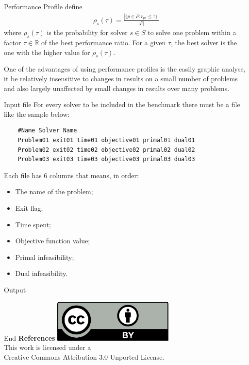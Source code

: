 \documentclass[a0paper,portrait]{baposter}
\begin{document}
\begin{poster}
\begin{posterbox}[column=0,below=auto,height=bottom]{Performance Profile}
    \cite{Dolan2001} define
    \begin{align*}
      \rho_s(\tau) = \frac{| \{p \in P: r_{ps} \leq \tau\} |}{| P |}
    \end{align*}
    where $\rho_s(\tau)$ is the probability for solver $s \in S$ to solve one
    problem within a factor $\tau \in \mathbb{R}$ of the best performance
    ratio. For a given $\tau$, the best solver is the one with the higher
    value for $\rho_s(\tau)$.

    One of the advantages of using performance profiles is the easily graphic
    analyse, it be relatively insensitive to changes in results on a small
    number of problems and also largely unaffected by small changes in
    results over many problems.
  \end{posterbox}

  \begin{posterbox}[column=1]{Input file}
    For every solver to be included in the benchmark there must be a file like
    the sample below:

    \begin{lstlisting}
    #Name Solver Name
    Problem01 exit01 time01 objective01 primal01 dual01
    Problem02 exit02 time02 objective02 primal02 dual02
    Problem03 exit03 time03 objective03 primal03 dual03
    \end{lstlisting}

    Each file has 6 columns that means, in order:
    \begin{itemize}
      \item The name of the problem;
      \item Exit flag;
      \item Time spent;
      \item Objective function value;
      \item Primal infeasibility;
      \item Dual infeasibility.
    \end{itemize}
  \end{posterbox}

  \begin{posterbox}[column=1,below=auto]{Output}
    
  \end{posterbox}
  \begin{posterbox}[column=1,below=auto]{End}
    \textbf{References}
    \vfill
    \includegraphics[height=60pt]{figures/cc-by} \\
    This work is licensed under a\\
    Creative Commons Attribution 3.0 Unported License.
  \end{posterbox}

\end{poster}
\end{document}
